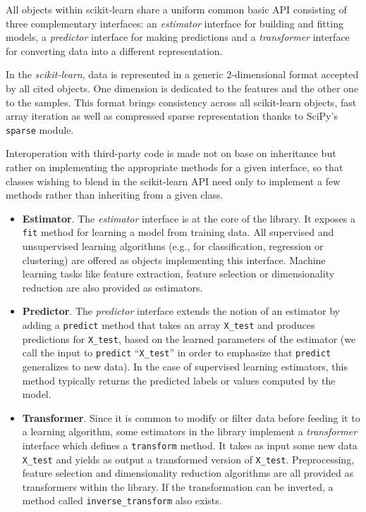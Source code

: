 \documentclass{frontiersSCNS} %
\begin{document}
All objects within scikit-learn share a uniform common basic API consisting of three
complementary interfaces: an \textit{estimator} interface for building and
fitting models, a \textit{predictor} interface for making predictions and a
\textit{transformer} interface for converting data into a different representation.

In the {\em scikit-learn}, data is represented in a generic 2-dimensional format
accepted by all cited objects. One dimension is dedicated to the features and
the other one to the samples. This format brings
consistency across all scikit-learn objects, fast array iteration
as well as compressed sparse representation thanks to SciPy's \texttt{sparse} module.

Interoperation with third-party code is made not on base on inheritance but
rather on implementing the appropriate methods for a given interface, so that
classes wishing to blend in the scikit-learn API need only to implement a few
methods rather than inheriting from a given class.

\begin{itemize}
\item {\bf Estimator}. The \textit{estimator} interface is at the core of the library. It exposes a
    \texttt{fit} method for learning a model from training data.  All supervised
    and unsupervised learning algorithms (e.g., for classification, regression or
    clustering) are offered as objects implementing this interface. Machine
    learning tasks like feature extraction, feature selection or dimensionality
    reduction are also provided as estimators.

\item {\bf Predictor}. The \textit{predictor} interface extends the notion of an estimator
    by adding a \texttt{predict}
    method that takes an array \texttt{X\_test} and produces
    predictions for \texttt{X\_test}, based on the learned parameters of the
    estimator (we call the input to \texttt{predict} ``\texttt{X\_test}'' in order
    to emphasize that \texttt{predict} generalizes to new data). In the case of
    supervised learning estimators, this method typically returns the predicted
    labels or values computed by the model.

\item {\bf Transformer}. Since it is common to modify or filter data before feeding it to a learning
    algorithm, some estimators in the library implement a \textit{transformer}
    interface which defines a \texttt{transform} method. It takes as input some new
    data \texttt{X\_test} and yields as output a transformed version of
    \texttt{X\_test}. Preprocessing, feature selection and dimensionality reduction
    algorithms are all provided as transformers within the library. If the transformation
    can be inverted, a method called \verb!inverse_transform! also exists.

\end{itemize}
\end{document}
